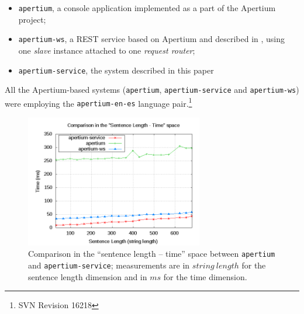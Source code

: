 \documentclass[11pt]{article}
\begin{document}
\begin{itemize}
 \item {\tt\small apertium}, a console application implemented as a part of the Apertium project;
 \item {\tt\small apertium-ws}, a REST service based on Apertium and described in \cite{sanchez-cartagena2009scalable}, using one \emph{slave} instance attached to one \emph{request router};
 \item {\tt\small apertium-service}, the system described in this paper
\end{itemize}

All the Apertium-based systems ({\tt\small apertium}, {\tt\small apertium-service} and 
{\tt\small apertium-ws}) were employing the {\tt\small apertium-en-es} language 
pair.\footnote{SVN Revision 16218}


\begin{figure}[!ht]
\begin{center}
\includegraphics[width=7.75cm]{compap}
\end{center}
\caption{Comparison in the ``sentence length -- time'' space between {\tt\small apertium} 
and {\tt\small apertium-service}; measurements are in $string\ length$ for the sentence 
length dimension and in $ms$ for the time dimension.}
\label{fig:compap}
\end{figure}
\end{document}

